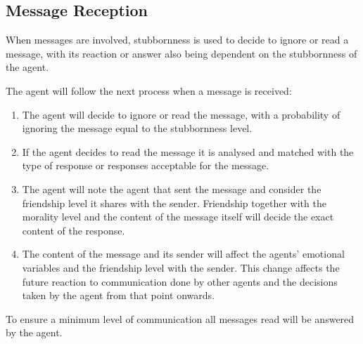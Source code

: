 \subsection{Message Reception}
When messages are involved, stubbornness is used to decide to ignore or read a message, with its reaction or answer also being dependent on the stubbornness of the agent. \par
The agent will follow the next process when a message is received:
\begin{enumerate}
    \item The agent will decide to ignore or read the message, with a probability of ignoring the message equal to the stubbornness level.
    \item If the agent decides to read the message it is analysed and matched with the type of response or responses acceptable for the message. 
    \item The agent will note the agent that sent the message and consider the friendship level it shares with the sender. Friendship together with the morality level and the content of the message itself will decide the exact content of the response.
    \item The content of the message and its sender will affect the agents’ emotional variables and the friendship level with the sender. This change affects the future reaction to communication done by other agents and the decisions taken by the agent from that point onwards. 
\end{enumerate}
To ensure a minimum level of communication all messages read will be answered by the agent. 

